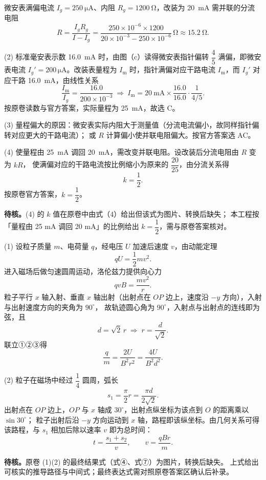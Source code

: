 \begin{answer}
微安表满偏电流 $I_{g}=\SI{250}{\micro\ampere}$、内阻 $R_{g}=\SI{1200}{\ohm}$，改装为 \SI{20}{\milli\ampere} 需并联的分流电阻
\[
  R=\frac{I_{g}R_{g}}{I-I_{g}}
   =\frac{250\times10^{-6}\times1200}{20\times10^{-3}-250\times10^{-6}}\,\si{\ohm}
   \approx\SI{15.2}{\ohm}.
\]

(2) 标准毫安表示数 \SI{16.0}{\milli\ampere} 时，由图（c）读得微安表指针偏转 $\dfrac{4}{5}$ 满偏，即微安表电流 $I_{g}'=200\,\si{\micro\ampere}$。改装表量程为 $I_{\text{m}}$ 时，指针满偏对应干路电流 $I_{\text{m}}$，而 $I_{g}'$ 对应干路 \SI{16.0}{\milli\ampere}，由线性关系
\[
  \frac{I_{\text{m}}}{I_{g}}=\frac{16.0}{200\times10^{-3}}\ \Longrightarrow\ I_{\text{m}}=\SI{20}{\milli\ampere}\times\frac{16.0}{16.0}\cdot\frac{1}{4/5}.
\]
按原卷读数与官方答案，实际量程为 \SI{25}{\milli\ampere}，故选 C。

(3) 量程偏大的原因：微安表实际内阻大于测量值（分流电流偏小，故同样指针偏转对应更大的干路电流）；
或 $R$ 计算偏小使并联电阻偏大。按官方答案选 AC。

(4) 使量程由 \SI{25}{\milli\ampere} 调回 \SI{20}{\milli\ampere}，需改变并联电阻。设改装后分流电阻由 $R$ 变为 $kR$，
使满偏对应的干路电流按比例缩小为原来的 $\dfrac{20}{25}$，由分流关系得
\[
  k=\frac{1}{2}.
\]
按原卷官方答案，$k=\dfrac{1}{2}$。

\begin{gktip}
\textbf{待核。}(4) 的 $k$ 值在原卷中由式（4）给出但该式为图片、转换后缺失；
本工程按「量程由 25 mA 调回 20 mA」的比例给出 $k=\dfrac{1}{2}$，需与原卷答案核对。
\end{gktip}
\end{answer}

\begin{answer}
(1) 设粒子质量 $m$、电荷量 $q$，经电压 $U$ 加速后速度 $v$，由动能定理
\[
  qU=\frac{1}{2}mv^{2}. \tag{①}
\]
进入磁场后做匀速圆周运动，洛伦兹力提供向心力
\[
  qvB=\frac{mv^{2}}{r}. \tag{②}
\]
粒子平行 $x$ 轴入射、垂直 $x$ 轴出射（出射点在 $OP$ 边上，速度沿 $-y$ 方向），入射与出射速度方向的夹角为 $90^{\circ}$，
故轨迹圆心角为 $90^{\circ}$，入射点与出射点的连线即为弦，且
\[
  d=\sqrt{2}\,r \;\Longrightarrow\; r=\frac{d}{\sqrt{2}}. \tag{③}
\]
联立①②③得
\[
  \frac{q}{m}=\frac{2U}{B^{2}r^{2}}=\frac{4U}{B^{2}d^{2}}.
\]

(2) 粒子在磁场中经过 $\dfrac{1}{4}$ 圆周，弧长
\[
  s_{1}=\frac{\pi}{2}r=\frac{\pi d}{2\sqrt{2}}.
\]
出射点在 $OP$ 边上，$OP$ 与 $x$ 轴成 $30^{\circ}$，出射点纵坐标为该点到 $O$ 的距离乘以 $\sin30^{\circ}$；
粒子出射后沿 $-y$ 方向运动到 $x$ 轴，路程即该纵坐标。由几何关系可得该路程，与 $s_{1}$ 相加后除以速率 $v$ 即为总时间：
\[
  t=\frac{s_{1}+s_{2}}{v},\qquad v=\frac{qBr}{m}.
\]
\begin{gktip}
\textbf{待核。}原卷 (1)(2) 的最终结果式（式④、式⑦）为图片，转换后缺失。
上式给出可核实的推导路径与中间式；最终表达式需对照原卷答案区确认后补录。
\end{gktip}
\end{answer}

